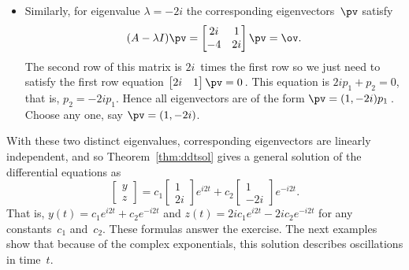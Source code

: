 \begin{example}
\begin{solution}
\begin{itemize}
\item Similarly, for eigenvalue \(\lambda=-2i\) the corresponding eigenvectors~\(\pv\) satisfy
\begin{equation*}
(A-\lambda I)\pv=\begin{bmatrix} 2i&1\\-4&2i \end{bmatrix}\pv
=\ov.
\end{equation*}
The second row of this matrix is \(2i\)~times the first row so we just need to satisfy the first row equation \(\begin{bmatrix} 2i&1 \end{bmatrix}\pv=0\)\,.
This equation is \(2ip_1+p_2=0\), that is, \(p_2=-2ip_1\).
Hence all eigenvectors are of the form \(\pv=(1,-2i)p_1\)\,.
Choose any one, say \(\pv=(1,-2i)\).
\end{itemize}
With these two distinct eigenvalues, corresponding eigenvectors are linearly independent, and so Theorem~\ref{thm:ddtsol} gives a general solution of the differential equations as
\begin{equation*}
\begin{bmatrix} y\\z \end{bmatrix}
=c_1\begin{bmatrix} 1\\2i \end{bmatrix}e^{i2t}
+c_2\begin{bmatrix} 1\\-2i \end{bmatrix}e^{-i2t}.
\end{equation*}
That is, \(y(t)=c_1e^{i2t}+c_2e^{-i2t}\) and \(z(t)=2ic_1e^{i2t}-2ic_2e^{-i2t}\) for any constants~\(c_1\) and~\(c_2\).
These formulas answer the exercise.
The next examples show that because of the complex exponentials, this solution describes oscillations in time~\(t\).
\end{solution}
\end{example}




